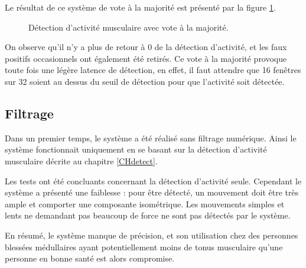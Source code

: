 \documentclass[letterpaper, twoside, 12pt, memoire, creativecommons, hyperref]{thETS}
\begin{document}
Le résultat de ce système de vote à la majorité est présenté par la figure \ref{fig:onsetAvecVote}.

\begin{figure}
	\centering
	\caption{Détection d'activité musculaire avec vote à la majorité.}
	\label{fig:onsetAvecVote}
\end{figure}

On observe qu'il n'y a plus de retour à 0 de la détection d'activité, et les faux positifs occasionnels ont également été retirés. Ce vote à la majorité provoque toute fois une légère latence de détection, en effet, il faut attendre que 16 fenêtres sur 32 soient au dessus du seuil de détection pour que l'activité soit détectée.

\subsection{Filtrage}\label{CHfiltrage}

Dans un premier temps, le système a été réalisé sans filtrage numérique. Ainsi le système fonctionnait uniquement en se basant sur la détection d'activité musculaire décrite au chapitre \ref{CHdetect}.

Les tests ont été concluants concernant la détection d'activité seule. Cependant le système a présenté une faiblesse : pour être détecté, un mouvement doit être très ample et comporter une composante isométrique. Les mouvements simples et lents ne demandant pas beaucoup de force ne sont pas détectés par le système. 

En résumé, le système manque de précision, et son utilisation chez des personnes blessées médullaires ayant potentiellement moins de tonus musculaire qu'une personne en bonne santé est alors compromise. 
\end{document}
